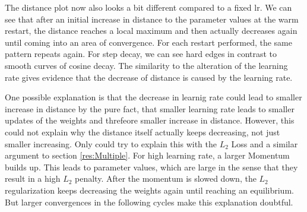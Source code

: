 The distance plot now also looks a bit different compared to a fixed lr. We can
see that after an initial increase in distance to the parameter values at the
warm restart, the distance reaches a local maximum and then actually decreases
again until coming into an area of convergence. For each restart performed, the
same pattern repeats again. For step decay, we can see hard edges in contrast to
smooth curves of cosine decay. The similarity to the alteration of the learning
rate gives evidence that the decrease of distance is caused by the learning
rate. 

One possible explanation is that the decrease in learnig rate could lead to
smaller increase in distance by the pure fact, that smaller learning rate leads
to smaller updates of the weights and threfeore smaller increase in distance.
However, this could not explain why the distance itself actually keeps
decreasing, not just smaller increasing. Only could try to explain this with the
$L_2$ Loss and a similar argument to section \ref{res:Multiple}. For high
learning rate, a larger Momentum builds up. This leads to parameter values,
which are large in the sense that they result in a high $L_2$ penalty. After the
momentum is slowed down, the $L_2$ regularization keeps decreasing the weights
again until reaching an equilibrium. But larger convergences in the following
cycles make this explanation doubtful. 


